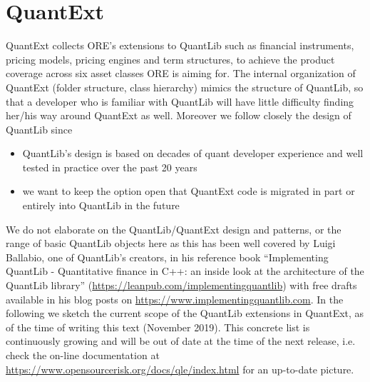 \documentclass[12pt, a4paper]{article}
\begin{document}
\newpage
\section{QuantExt}
QuantExt collects ORE's extensions to QuantLib such as financial instruments, pricing models, pricing engines and term structures, to achieve the product coverage across six
asset classes ORE is aiming for. The internal organization of QuantExt (folder structure, class hierarchy) mimics the structure of QuantLib, so that a developer who is familiar with QuantLib will have little difficulty finding her/his way around QuantExt as well.
Moreover we follow closely the design of QuantLib since
\begin{itemize}
\item QuantLib's design is based on decades of quant developer experience and well tested in practice over the past 20 years
\item we want to keep the option open that QuantExt code is migrated in part or entirely into QuantLib in the future
\end{itemize}

We do not elaborate on the QuantLib/QuantExt design and patterns, or the range of basic QuantLib objects here as this has been well covered by Luigi Ballabio, one of QuantLib's creators, in his reference book ``Implementing QuantLib - Quantitative finance in C++: an inside look at the architecture of the QuantLib library''
(\url{https://leanpub.com/implementingquantlib}) with free drafts available in his blog posts on \url{https://www.implementingquantlib.com}.
In the following we sketch the current scope of the QuantLib extensions in QuantExt, as of the time of writing this text (November 2019). 
This concrete list is continuously growing and will be out of date at the time of the next release, i.e. check the on-line documentation at \url{https://www.opensourcerisk.org/docs/qle/index.html} for an up-to-date picture.
\end{document}
